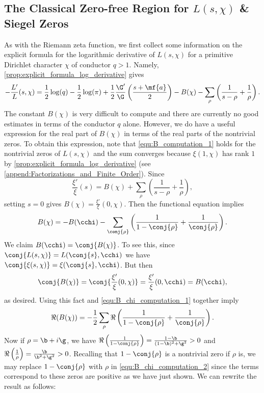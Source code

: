     \subsection*{The Classical Zero-free Region for \texorpdfstring{$L(s,\chi)$}{L(s,\chi)} \& Siegel Zeros}
      As with the Riemann zeta function, we first collect some information on the explicit formula for the logarithmic derivative of $L(s,\chi)$ for a primitive Dirichlet character $\chi$ of conductor $q > 1$. Namely, \cref{prop:explicit_formula_log_derivative} gives
      \begin{equation}\label{equ:explicit_log_derivative_Dirichlet}
        -\frac{L'}{L}(s,\chi) = \frac{1}{2}\log(q)-\frac{1}{2}\log(\pi)+\frac{1}{2}\frac{\G'}{\G}\left(\frac{s+\mf{a}}{2}\right)-B(\chi)-\sum_{\rho}\left(\frac{1}{s-\rho}+\frac{1}{\rho}\right).
      \end{equation}
      The constant $B(\chi)$ is very difficult to compute and there are currently no good estimates in terms of the conductor $q$ alone. However, we do have a useful expression for the real part of $B(\chi)$ in terms of the real parts of the nontrivial zeros. To obtain this expression, note that \cref{equ:B_computation_1} holds for the nontrivial zeros of $L(s,\chi)$ and the sum converges because $\xi(1,\chi)$ has rank $1$ by \cref{prop:explicit_formula_log_derivative} (see \cref{append:Factorizations_and_Finite_Order}). Since
      \[
        \frac{\xi'}{\xi}(s) = B(\chi)+\sum_{\rho}\left(\frac{1}{s-\rho}+\frac{1}{\rho}\right),
      \]
      setting $s = 0$ gives $B(\chi) = \frac{\xi'}{\xi}(0,\chi)$. Then the functional equation implies
      \begin{equation}\label{equ:B_chi_computation_1}
        B(\chi) = -B(\cchi)-\sum_{\conj{\rho}}\left(\frac{1}{1-\conj{\rho}}+\frac{1}{\conj{\rho}}\right).
      \end{equation}
      We claim $B(\cchi) = \conj{B(\chi)}$. To see this, since $\conj{L(s,\chi)} = L(\conj{s},\cchi)$ we have $\conj{\xi(s,\chi)} = \xi(\conj{s},\cchi)$. But then
      \[
        \conj{B(\chi)} = \conj{\frac{\xi'}{\xi}(0,\chi)} = \frac{\xi'}{\xi}(0,\cchi) = B(\cchi),
      \]
      as desired. Using this fact and \cref{equ:B_chi_computation_1} together imply
      \begin{equation}\label{equ:B_chi_computation_2}
        \Re(B(\chi)) = -\frac{1}{2}\sum_{\rho}\Re\left(\frac{1}{1-\conj{\rho}}+\frac{1}{\conj{\rho}}\right).
      \end{equation}
      Now if $\rho = \b+i\g$, we have $\Re\left(\frac{1}{1-\conj{\rho}}\right) = \frac{1-\b}{(1-\b)^{2}+\g^{2}} > 0$ and $\Re\left(\frac{1}{\rho}\right) = \frac{\b}{\b^{2}+\g^{2}} > 0$. Recalling that $1-\conj{\rho}$ is a nontrivial zero if $\rho$ is, we may replace $1-\conj{\rho}$ with $\rho$ in \cref{equ:B_chi_computation_2} since the terms correspond to these zeros are positive as we have just shown. We can rewrite the result as follows:
